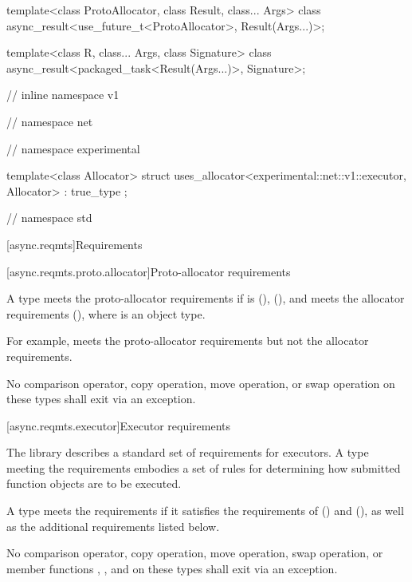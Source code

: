 \begin{codeblock}
{{{{  template<class ProtoAllocator, class Result, class... Args>
    class async_result<use_future_t<ProtoAllocator>, Result(Args...)>;

  template<class R, class... Args, class Signature>
    class async_result<packaged_task<Result(Args...)>, Signature>;

} // inline namespace v1
} // namespace net
} // namespace experimental

  template<class Allocator>
    struct uses_allocator<experimental::net::v1::executor, Allocator>
      : true_type {};

} // namespace std
\end{codeblock}



[async.reqmts]{Requirements}


[async.reqmts.proto.allocator]{Proto-allocator requirements}

\pnum
A type  meets the proto-allocator requirements if  is  (),  (), and  meets the allocator requirements (), where  is an object type. \begin{note} For example,  meets the proto-allocator requirements but not the allocator requirements. \end{note} No comparison operator, copy operation, move operation, or swap operation on these types shall exit via an exception.



[async.reqmts.executor]{Executor requirements}

\pnum
The library describes a standard set of requirements for executors. A type meeting the  requirements embodies a set of rules for determining how submitted function objects are to be executed.

\pnum
A type  meets the  requirements if it satisfies the requirements of  () and  (), as well as the additional requirements listed below.

\pnum
No comparison operator, copy operation, move operation, swap operation, or member functions , , and  on these types shall exit via an exception.

